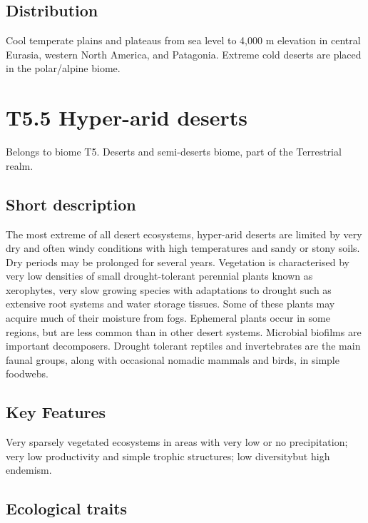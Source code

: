 \documentclass[
  letterpaper,
  DIV=11,
  numbers=noendperiod]{scrartcl}
\begin{document}
\subsection{Distribution}\label{distribution-91}

Cool temperate plains and plateaus from sea level to 4,000 m elevation
in central Eurasia, western North America, and Patagonia. Extreme cold
deserts are placed in the polar/alpine biome.

\section{T5.5 Hyper-arid deserts}\label{t5.5-hyper-arid-deserts}

Belongs to biome T5. Deserts and semi-deserts biome, part of the
Terrestrial realm.

\subsection{Short description}\label{short-description-92}

The most extreme of all desert ecosystems, hyper-arid deserts are
limited by very dry and often windy conditions with high temperatures
and sandy or stony soils. Dry periods may be prolonged for several
years. Vegetation is characterised by very low densities of small
drought-tolerant perennial plants known as xerophytes, very slow growing
species with adaptations to drought such as extensive root systems and
water storage tissues. Some of these plants may acquire much of their
moisture from fogs. Ephemeral plants occur in some regions, but are less
common than in other desert systems. Microbial biofilms are important
decomposers. Drought tolerant reptiles and invertebrates are the main
faunal groups, along with occasional nomadic mammals and birds, in
simple foodwebs.

\subsection{Key Features}\label{key-features-92}

Very sparsely vegetated ecosystems in areas with very low or no
precipitation; very low productivity and simple trophic structures; low
diversitybut high endemism.

\subsection{Ecological traits}\label{ecological-traits-92}
\end{document}
